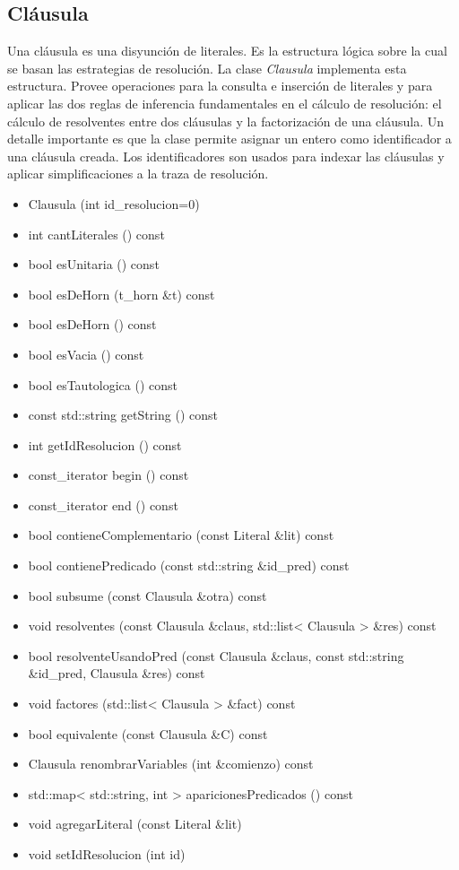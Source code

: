 \documentclass[a4paper,12pt]{article}
\begin{document}
\subsection{Cláusula}
Una cláusula es una disyunción de literales. Es la estructura lógica sobre la cual se basan
las estrategias de resolución. La clase \emph{Clausula} implementa esta estructura. Provee operaciones
para la consulta e inserción de literales y para aplicar las dos reglas de inferencia fundamentales en
el cálculo de resolución: el cálculo de resolventes entre dos cláusulas y la factorización de una cláusula.
Un detalle importante es que la clase permite asignar un entero como identificador a una cláusula creada. Los
identificadores son usados para indexar las cláusulas y aplicar simplificaciones a la traza de resolución.
\begin{itemize}
\renewcommand{\labelitemi}{$\bullet$}
\item Clausula (int id\_resolucion=0)
\item int cantLiterales () const
\item bool esUnitaria () const
\item bool esDeHorn (t\_horn \&t) const
\item bool esDeHorn () const
\item bool esVacia () const
\item bool esTautologica () const
\item const std::string getString () const
\item int getIdResolucion () const
\item const\_iterator begin () const
\item const\_iterator end () const
\item bool contieneComplementario (const Literal \&lit) const
\item bool contienePredicado (const std::string \&id\_pred) const
\item bool subsume (const Clausula \&otra) const
\item void resolventes (const Clausula \&claus, std::list< Clausula > \&res) const
\item bool resolventeUsandoPred (const Clausula \&claus, const std::string \&id\_pred, Clausula \&res) const
\item void factores (std::list< Clausula > \&fact) const
\item bool equivalente (const Clausula \&C) const
\item Clausula renombrarVariables (int \&comienzo) const
\item std::map< std::string, int > aparicionesPredicados () const
\item void agregarLiteral (const Literal \&lit)
\item void setIdResolucion (int id)
\end{itemize}
\end{document}
